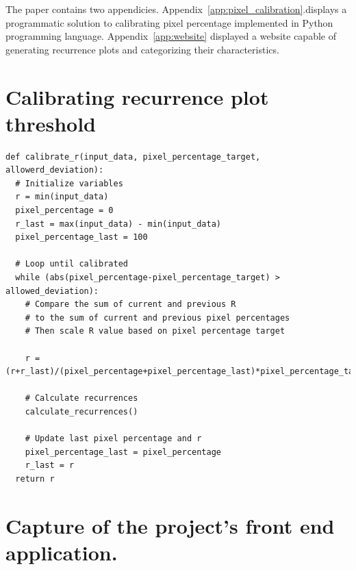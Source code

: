 \documentclass[a4paper,12pt,fleqn]{article}
\begin{document}
\newpage
\begin{appendices}
  The paper contains two appendicies. Appendix~\ref{app:pixel_calibration}.displays a programmatic solution to calibrating pixel percentage implemented in Python programming language.
  \newline
  Appendix~\ref{app:website} displayed a website capable of generating recurrence plots and categorizing their characteristics.
  \newpage
  \section{Calibrating recurrence plot threshold }
  \begin{lstlisting}[caption={Pixel percentage calibration}]
def calibrate_r(input_data, pixel_percentage_target, allowerd_deviation):
  # Initialize variables
  r = min(input_data)
  pixel_percentage = 0
  r_last = max(input_data) - min(input_data)
  pixel_percentage_last = 100

  # Loop until calibrated
  while (abs(pixel_percentage-pixel_percentage_target) > allowed_deviation):
    # Compare the sum of current and previous R
    # to the sum of current and previous pixel percentages
    # Then scale R value based on pixel percentage target

    r = (r+r_last)/(pixel_percentage+pixel_percentage_last)*pixel_percentage_target
    
    # Calculate recurrences
    calculate_recurrences()

    # Update last pixel percentage and r
    pixel_percentage_last = pixel_percentage
    r_last = r
  return r
  \end{lstlisting}
  \label{app:pixel_calibration}

  \newpage
  \section{Capture of the project's front end application.}
  \begin{center}
  \end{center}
  \label{app:website}
\end{appendices}
\end{document}
